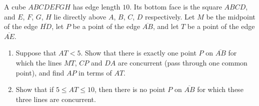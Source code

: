 A cube $ABCDEFGH$ has edge length $10$. Its bottom face is the square $ABCD$, and $E$, $F$, $G$, $H$ lie directly above $A$, $B$, $C$, $D$ respectively. Let $M$ be the midpoint of the edge $\overline{HD}$, let $P$ be a point of the edge $\overline{AB}$, and let $T$ be a point of the edge $\overline{AE}$.
\begin{enumerate}
\item[(a)] Suppose that $AT<5$. Show that there is exactly one point $P$ on $\overline{AB}$ for which the lines $MT$, $CP$ and $DA$ are concurrent (pass through one common point), and find $AP$ in terms of $AT$.
\item[(b)] Show that if $5\le AT\le10$, then there is no point $P$ on $\overline{AB}$ for which these three lines are concurrent.
\end{enumerate}
